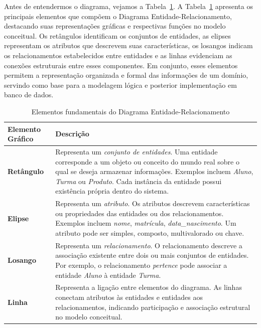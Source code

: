 \documentclass[12pt,a4paper,openright]{book}
\begin{document}
Antes de entendermos o diagrama, vejamos a Tabela~\ref{tab:elementos_der}. A Tabela~\ref{tab:elementos_der} apresenta os principais elementos que compõem o Diagrama Entidade-Relacionamento, destacando suas representações gráficas e respectivas funções no modelo conceitual. Os retângulos identificam os conjuntos de entidades, as elipses representam os atributos que descrevem suas características, os losangos indicam os relacionamentos estabelecidos entre entidades e as linhas evidenciam as conexões estruturais entre esses componentes. Em conjunto, esses elementos permitem a representação organizada e formal das informações de um domínio, servindo como base para a modelagem lógica e posterior implementação em banco de dados.


\begin{table}[h!]
\centering
\renewcommand{\arraystretch}{1.4}
\begin{tabular}{|p{3.5cm}|p{9cm}|}
\hline
\textbf{Elemento Gráfico} & \textbf{Descrição} \\ \hline

\textbf{Retângulo} &
Representa um \textit{conjunto de entidades}. Uma entidade corresponde a um objeto ou conceito do mundo real sobre o qual se deseja armazenar informações. Exemplos incluem \textit{Aluno}, \textit{Turma} ou \textit{Produto}. Cada instância da entidade possui existência própria dentro do sistema. \\ \hline

\textbf{Elipse} &
Representa um \textit{atributo}. Os atributos descrevem características ou propriedades das entidades ou dos relacionamentos. Exemplos incluem \textit{nome}, \textit{matrícula}, \textit{data\_nascimento}. Um atributo pode ser simples, composto, multivalorado ou chave. \\ \hline

\textbf{Losango} &
Representa um \textit{relacionamento}. O relacionamento descreve a associação existente entre dois ou mais conjuntos de entidades. Por exemplo, o relacionamento \textit{pertence} pode associar a entidade \textit{Aluno} à entidade \textit{Turma}. \\ \hline

\textbf{Linha} &
Representa a ligação entre elementos do diagrama. As linhas conectam atributos às entidades e entidades aos relacionamentos, indicando participação e associação estrutural no modelo conceitual. \\ \hline

\end{tabular}

\caption{Elementos fundamentais do Diagrama Entidade-Relacionamento}
\label{tab:elementos_der}

\end{table}
\end{document}
